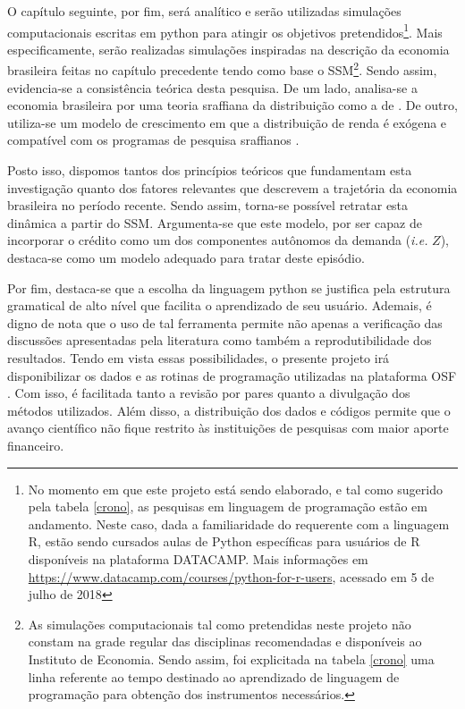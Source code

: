 O capítulo seguinte, por fim, será analítico e serão utilizadas simulações computacionais escritas em python para atingir os objetivos pretendidos\footnote{No momento em que este projeto está sendo elaborado, e tal como sugerido pela tabela \ref{crono}, as pesquisas em linguagem de programação estão em andamento. Neste caso, dada a familiaridade do requerente com a linguagem R, estão sendo cursados aulas de Python específicas para usuários de R disponíveis na plataforma DATACAMP. Mais informações em \url{https://www.datacamp.com/courses/python-for-r-users}, acessado em 5 de julho de 2018}. 
Mais especificamente, serão realizadas simulações inspiradas na descrição da economia brasileira feitas no capítulo precedente tendo como base o SSM\footnote{As simulações computacionais tal como pretendidas neste projeto não constam na grade regular das disciplinas recomendadas e disponíveis ao Instituto de Economia. Sendo assim, foi explicitada na tabela \ref{crono} uma linha referente ao tempo destinado ao aprendizado de linguagem de programação para obtenção dos instrumentos necessários. }. 
Sendo assim, evidencia-se a consistência teórica desta pesquisa. De um lado, analisa-se a economia brasileira por uma teoria sraffiana da distribuição como a de \textcite{pivetti_essay_1992}. De outro, utiliza-se um modelo de crescimento em que a distribuição de renda é exógena e compatível com os programas de pesquisa sraffianos \cite{aspromourgos_sraffian_2004}. 

Posto isso, dispomos tantos dos princípios teóricos que fundamentam esta investigação quanto dos fatores relevantes que descrevem a trajetória da economia brasileira no período recente. Sendo assim, torna-se possível  retratar esta dinâmica a partir do SSM.  Argumenta-se que este modelo, por ser capaz de incorporar o crédito como um dos componentes autônomos da demanda (\textit{i.e.} $Z$), destaca-se como um modelo adequado para tratar deste episódio.

Por fim, destaca-se que a escolha da linguagem python se justifica pela estrutura gramatical de alto nível que facilita o aprendizado de seu usuário. 
Ademais, é digno de nota que o uso de tal ferramenta permite não apenas a verificação das discussões apresentadas pela literatura como também a reprodutibilidade dos resultados. Tendo em vista essas possibilidades, o presente projeto irá disponibilizar os dados e as rotinas de programação utilizadas na plataforma OSF \cite{center_for_open_science_osfhome_nodate}. Com isso, é facilitada tanto a revisão por pares quanto a divulgação dos métodos utilizados. Além disso, a distribuição dos dados e códigos permite que o avanço científico não fique restrito às instituições de pesquisas com maior aporte financeiro. 


